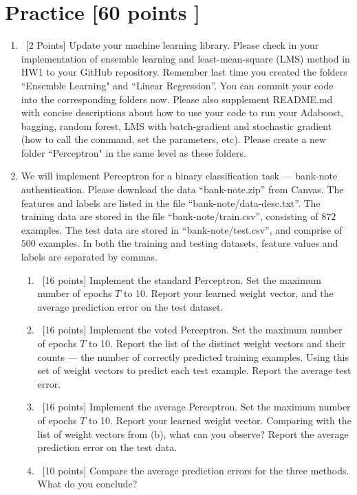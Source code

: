 \documentclass[12pt, fullpage,letterpaper]{article}
\begin{document}
\section{Practice [60 points ]}
\begin{enumerate}
	\item~[2 Points] Update your machine learning library. Please check in your implementation of ensemble learning and least-mean-square (LMS) method in HW1 to your GitHub repository. Remember last time you created the folders ``Ensemble Learning" and ``Linear Regression''. You can commit your code into the corresponding folders now. Please also supplement README.md with concise descriptions about how to use your code to run your Adaboost, bagging, random forest, LMS with batch-gradient and stochastic gradient (how to call the command, set the parameters, etc). Please create a new folder ``Perceptron" in the same level as these folders.  

\item We will implement  Perceptron for a binary classification task --- bank-note authentication. Please download the data ``bank-note.zip'' from Canvas. The features and labels are listed in the file ``bank-note/data-desc.txt''. The training data are stored in the file ``bank-note/train.csv'', consisting of $872$ examples. The test data are stored in ``bank-note/test.csv'', and comprise of $500$ examples. In both the training and testing datasets, feature values and labels are separated by commas. 
\begin{enumerate}
	\item~[16 points] Implement the standard Perceptron. Set the maximum number of epochs $T$ to 10. Report your learned weight vector, and the average prediction error on the test dataset. 
	\item~[16 points] Implement the voted Perceptron. Set the maximum number of epochs $T$ to 10. Report the list of the distinct weight vectors and their counts --- the number of correctly predicted training examples. Using this set of weight vectors to predict each test example. Report the average test error. 
	\item~[16 points] Implement the average Perceptron. Set the maximum number of epochs $T$ to 10. Report your learned weight vector. Comparing with the list of weight vectors from (b), what can you observe? Report the average prediction error on the test data. 
	\item~[10 points] Compare the average prediction errors for the three methods. What do you conclude? 
\end{enumerate}


\end{enumerate}
\end{document}
